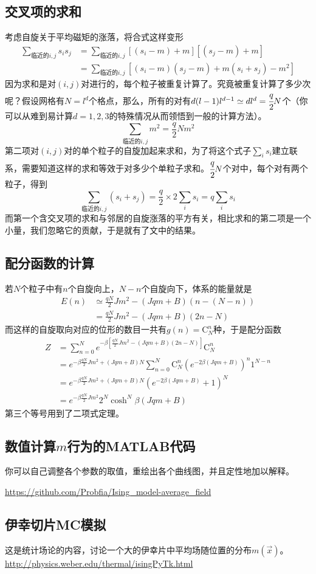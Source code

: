 \documentclass[a4paper,11pt]{ctexart}
\newcommand{\beq}{\begin{equation}}
\newcommand{\eeq}{\end{equation}}
\newcommand{\bea}{\begin{equation}\begin{aligned}}
\newcommand{\eea}{\end{aligned}\end{equation}}
\begin{document}
\subsection{交叉项的求和}
考虑自旋关于平均磁矩的涨落，将合式这样变形
\bea
\sum_{\text{临近的}i,j} s_i s_j &= \sum_{\text{临近的}i,j} [(s_i-m)+m][ (s_j-m)+m]\\
&= \sum_{\text{临近的}i,j}[(s_i-m)(s_j-m) +m(s_i+s_j) - m^2]
\eea
因为求和是对$(i,j)$对进行的，每个粒子被重复计算了。究竟被重复计算了多少次呢？假设网格有$N=l^d$个格点，那么，所有的对有$d(l-1)l^{d-1} \simeq dl^d=\cfrac{q}{2}N$个（你可以从难到易计算$d=1,2,3$的特殊情况从而领悟到一般的计算方法）。
\beq
\sum_{\text{临近的}i,j}m^2 =\frac{q}{2}Nm^2
\eeq
第二项对$(i,j)$对的单个粒子的自旋加起来求和，为了将这个式子$\sum_i s_i$建立联系，需要知道这样的求和等效于对多少个单粒子求和。$\cfrac{q}{2}N$个对中，每个对有两个粒子，得到
\beq
\sum_{\text{临近的}i,j} (s_i+s_j)= \frac{q}{2} \times 2 \sum_i s_i = q\sum_i s_i
\eeq
而第一个含交叉项的求和与邻居的自旋涨落的平方有关，相比求和的第二项是一个小量，我们忽略它的贡献，于是就有了文中的结果。
\subsection{配分函数的计算}
若$N$个粒子中有$n$个自旋向上，$N-n$个自旋向下，体系的能量就是
\bea
E(n) &\simeq \frac{qN}{2}Jm^2 - (Jqm+B)(n-(N-n))\\
&= \frac{qN}{2}Jm^2 - (Jqm+B)(2n-N)
\eea
而这样的自旋取向对应的位形的数目一共有$g(n) = \mathrm{C}_N^n$种，于是配分函数
\bea
Z &= \sum_{n=0}^N e^{-\beta[\frac{qN}{2}Jm^2 - (Jqm+B)(2n-N)]}\mathrm{C}_N^n\\
&= e^{-\beta \frac{qN}{2}Jm^2+(Jqm+B)N}\sum_{n=0}^N \mathrm{C}_N^n (e^{-2\beta(Jqm+B)})^n 1^{N-n} \\
&= e^{-\beta \frac{qN}{2}Jm^2+(Jqm+B)N}(e^{-2\beta(Jqm+B)}+1)^N\\
&= e^{-\beta \frac{qN}{2}Jm^2}2^N\cosh^N\beta(Jqm+B)
\eea
第三个等号用到了二项式定理。
\subsection{数值计算$m$行为的MATLAB代码}
你可以自己调整各个参数的取值，重绘出各个曲线图，并且定性地加以解释。
\par
\url{https://github.com/Probfia/Ising_model-average_field}
\subsection{伊幸切片MC模拟}
这是统计场论的内容，讨论一个大的伊幸片中平均场随位置的分布$m(\vec{x})$。
\url{http://physics.weber.edu/thermal/isingPyTk.html}
\end{document}
